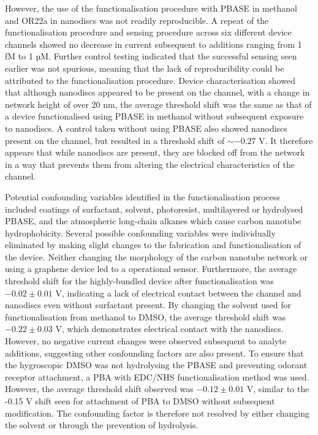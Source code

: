 \documentclass[
  a4paper,
]{scrbook}
\begin{document}
However, the use of the functionalisation procedure with PBASE in
methanol and OR22a in nanodiscs was not readily reproducible. A repeat
of the functionalisation procedure and sensing procedure across six
different device channels showed no decrease in current subsequent to
additions ranging from 1 fM to 1 µM. Further control testing indicated
that the successful sensing seen earlier was not spurious, meaning that
the lack of reproducibility could be attributed to the functionalisation
procedure. Device characterisation showed that although nanodiscs
appeared to be present on the channel, with a change in network height
of over 20 nm, the average threshold shift was the same as that of a
device functionalised using PBASE in methanol without subsequent
exposure to nanodiscs. A control taken without using PBASE also showed
nanodiscs present on the channel, but resulted in a threshold shift of
\(\sim -0.27\) V. It therefore appears that while nanodiscs are present,
they are blocked off from the network in a way that prevents them from
altering the electrical characteristics of the channel.

Potential confounding variables identified in the functionalisation
process included coatings of surfactant, solvent, photoresist,
multilayered or hydrolysed PBASE, and the atmospheric long-chain alkanes
which cause carbon nanotube hydrophobicity. Several possible confounding
variables were individually eliminated by making slight changes to the
fabrication and functionalisation of the device. Neither changing the
morphology of the carbon nanotube network or using a graphene device led
to a operational sensor. Furthermore, the average threshold shift for
the highly-bundled device after functionalisation was \(−0.02\pm0.01\)
V, indicating a lack of electrical contact between the channel and
nanodiscs even without surfactant present. By changing the solvent used
for functionalisation from methanol to DMSO, the average threshold shift
was \(−0.22\pm0.03\) V, which demonstrates electrical contact with the
nanodiscs. However, no negative current changes were observed subsequent
to analyte additions, suggesting other confounding factors are also
present. To ensure that the hygroscopic DMSO was not hydrolysing the
PBASE and preventing odorant receptor attachment, a PBA with EDC/NHS
functionalisation method was used. However, the average threshold shift
observed was \(-0.12\pm0.01\) V, similar to the -0.15 V shift seen for
attachment of PBA to DMSO without subsequent modification. The
confounding factor is therefore not resolved by either changing the
solvent or through the prevention of hydrolysis.
\end{document}
